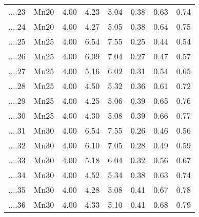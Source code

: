 \begin{table}[ht]
\begin{tabular}{rlrrrrrr}
  ....23 & Mn20 & 4.00 & 4.23 & 5.04 & 0.38 & 0.63 & 0.74 \\ 
  ....24 & Mn20 & 4.00 & 4.27 & 5.05 & 0.38 & 0.64 & 0.75 \\ 
  ....25 & Mn25 & 4.00 & 6.54 & 7.55 & 0.25 & 0.44 & 0.54 \\ 
  ....26 & Mn25 & 4.00 & 6.09 & 7.04 & 0.27 & 0.47 & 0.57 \\ 
  ....27 & Mn25 & 4.00 & 5.16 & 6.02 & 0.31 & 0.54 & 0.65 \\ 
  ....28 & Mn25 & 4.00 & 4.50 & 5.32 & 0.36 & 0.61 & 0.72 \\ 
  ....29 & Mn25 & 4.00 & 4.25 & 5.06 & 0.39 & 0.65 & 0.76 \\ 
  ....30 & Mn25 & 4.00 & 4.30 & 5.08 & 0.39 & 0.66 & 0.77 \\ 
  ....31 & Mn30 & 4.00 & 6.54 & 7.55 & 0.26 & 0.46 & 0.56 \\ 
  ....32 & Mn30 & 4.00 & 6.10 & 7.05 & 0.28 & 0.49 & 0.59 \\ 
  ....33 & Mn30 & 4.00 & 5.18 & 6.04 & 0.32 & 0.56 & 0.67 \\ 
  ....34 & Mn30 & 4.00 & 4.52 & 5.34 & 0.38 & 0.63 & 0.74 \\ 
  ....35 & Mn30 & 4.00 & 4.28 & 5.08 & 0.41 & 0.67 & 0.78 \\ 
  ....36 & Mn30 & 4.00 & 4.33 & 5.10 & 0.41 & 0.68 & 0.79 \\ 
   \hline
\end{tabular}
\end{table}

